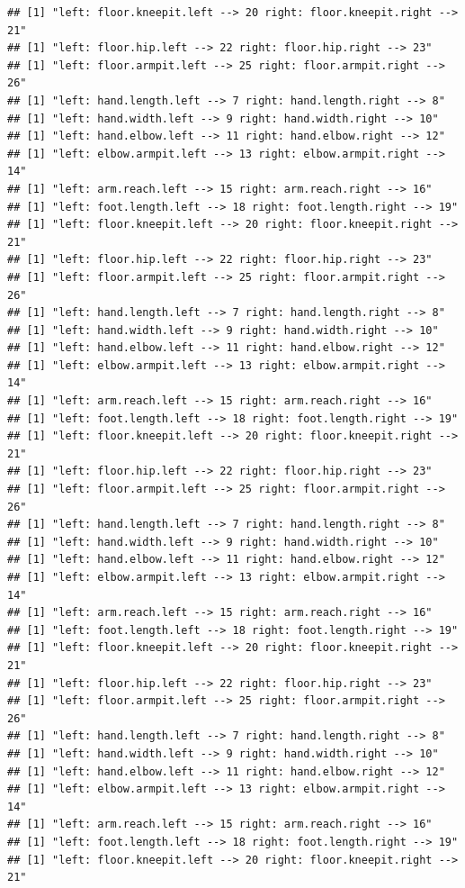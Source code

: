 \documentclass[]{article}
\begin{document}
\begin{verbatim}
## [1] "left: floor.kneepit.left --> 20 right: floor.kneepit.right --> 21"
## [1] "left: floor.hip.left --> 22 right: floor.hip.right --> 23"
## [1] "left: floor.armpit.left --> 25 right: floor.armpit.right --> 26"
## [1] "left: hand.length.left --> 7 right: hand.length.right --> 8"
## [1] "left: hand.width.left --> 9 right: hand.width.right --> 10"
## [1] "left: hand.elbow.left --> 11 right: hand.elbow.right --> 12"
## [1] "left: elbow.armpit.left --> 13 right: elbow.armpit.right --> 14"
## [1] "left: arm.reach.left --> 15 right: arm.reach.right --> 16"
## [1] "left: foot.length.left --> 18 right: foot.length.right --> 19"
## [1] "left: floor.kneepit.left --> 20 right: floor.kneepit.right --> 21"
## [1] "left: floor.hip.left --> 22 right: floor.hip.right --> 23"
## [1] "left: floor.armpit.left --> 25 right: floor.armpit.right --> 26"
## [1] "left: hand.length.left --> 7 right: hand.length.right --> 8"
## [1] "left: hand.width.left --> 9 right: hand.width.right --> 10"
## [1] "left: hand.elbow.left --> 11 right: hand.elbow.right --> 12"
## [1] "left: elbow.armpit.left --> 13 right: elbow.armpit.right --> 14"
## [1] "left: arm.reach.left --> 15 right: arm.reach.right --> 16"
## [1] "left: foot.length.left --> 18 right: foot.length.right --> 19"
## [1] "left: floor.kneepit.left --> 20 right: floor.kneepit.right --> 21"
## [1] "left: floor.hip.left --> 22 right: floor.hip.right --> 23"
## [1] "left: floor.armpit.left --> 25 right: floor.armpit.right --> 26"
## [1] "left: hand.length.left --> 7 right: hand.length.right --> 8"
## [1] "left: hand.width.left --> 9 right: hand.width.right --> 10"
## [1] "left: hand.elbow.left --> 11 right: hand.elbow.right --> 12"
## [1] "left: elbow.armpit.left --> 13 right: elbow.armpit.right --> 14"
## [1] "left: arm.reach.left --> 15 right: arm.reach.right --> 16"
## [1] "left: foot.length.left --> 18 right: foot.length.right --> 19"
## [1] "left: floor.kneepit.left --> 20 right: floor.kneepit.right --> 21"
## [1] "left: floor.hip.left --> 22 right: floor.hip.right --> 23"
## [1] "left: floor.armpit.left --> 25 right: floor.armpit.right --> 26"
## [1] "left: hand.length.left --> 7 right: hand.length.right --> 8"
## [1] "left: hand.width.left --> 9 right: hand.width.right --> 10"
## [1] "left: hand.elbow.left --> 11 right: hand.elbow.right --> 12"
## [1] "left: elbow.armpit.left --> 13 right: elbow.armpit.right --> 14"
## [1] "left: arm.reach.left --> 15 right: arm.reach.right --> 16"
## [1] "left: foot.length.left --> 18 right: foot.length.right --> 19"
## [1] "left: floor.kneepit.left --> 20 right: floor.kneepit.right --> 21"

\end{verbatim}
\end{document}
